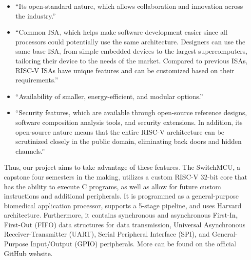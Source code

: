 \documentclass[conference]{IEEEtran}
\begin{document}
\begin{itemize}
    \item “Its open-standard nature, which allows collaboration and innovation across the industry.” \cite{b1}
    \item “Common ISA, which helps make software development easier since all processors could potentially use the same architecture. Designers can use the same base ISA, from simple embedded devices to the largest supercomputers, tailoring their device to the needs of the market. Compared to previous ISAs, RISC-V ISAs have unique features and can be customized based on their requirements.” \cite{b1}
    \item “Availability of smaller, energy-efficient, and modular options.” \cite{b1}
    \item “Security features, which are available through open-source reference designs, software composition analysis tools, and security extensions. In addition, its open-source nature means that the entire RISC-V architecture can be scrutinized closely in the public domain, eliminating back doors and hidden channels.” \cite{b1}
\end{itemize}

Thus, our project aims to take advantage of these features. The SwitchMCU, a capstone four semesters in the making, utilizes a custom RISC-V 32-bit core that has the ability to execute C programs, as well as allow for future custom instructions and additional peripherals. It is programmed as a general-purpose biomedical application processor, supports a 5-stage pipeline, and uses Harvard architecture. Furthermore, it contains synchronous and asynchronous First-In, First-Out (FIFO) data structures for data transmission, Universal Asynchronous Receiver-Transmitter (UART), Serial Peripheral Interface (SPI), and General-Purpose Input/Output (GPIO) peripherals. More can be found on the official GitHub website. \cite{b2}
\end{document}
